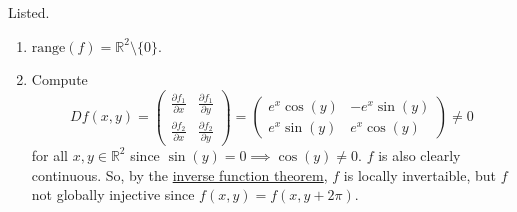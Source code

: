 	\begin{solution}
	  Listed. 
		\begin{enumerate}
			\item $\mathrm{range}(f) = \mathbb{R}^2 \setminus \{0\}$. 
			\item Compute 
				\begin{equation}
					Df(x, y) = \begin{pmatrix} 
						\frac{\partial f_1}{\partial x} & \frac{\partial f_1}{\partial y} \\ 
						\frac{\partial f_2}{\partial x} & \frac{\partial f_2}{\partial y} 
					\end{pmatrix} = \begin{pmatrix} 
 						e^x \cos(y) & -e^x \sin(y) \\ 
						e^x \sin(y) & e^x \cos(y)
					\end{pmatrix} \neq 0
				\end{equation}
				for all $x, y \in \mathbb{R}^2$ since $\sin(y) = 0 \implies \cos(y) \neq 0$. $f$ is also clearly continuous. So, by the \hyperref[thm:inverse-function-theorem]{inverse function theorem}, $f$ is locally invertaible, but $f$ not globally injective since $f(x, y) = f(x, y + 2 \pi)$. 


\end{enumerate}
\end{solution}
